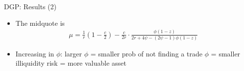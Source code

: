 \documentclass[english,10pt
,aspectratio=169
]{beamer}
\begin{document}
\begin{frame}{DGP: Results (2)}
\begin{itemize}
	\item The midquote is
	\begin{align*}
		\mu = \frac{1}{r} \left(1 - \frac{c}{2}\right) - \frac{c}{2r} \cdot \frac{\phi(1-z)}{2r + 4\psi - (2\psi-1)\phi(1-z)}
	\end{align*}
	\item Increasing in $\phi$: larger $\phi$ = smaller prob of not finding a trade $\phi$ = smaller illiquidity risk = more valuable asset
\end{itemize}
\end{frame}
\end{document}
